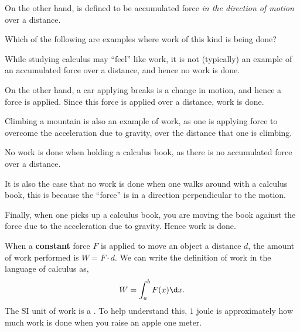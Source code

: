 \documentclass{ximera}
\begin{document}
On the other hand,  is defined to be accumulated force
\textit{in the direction of motion} over a distance.
\begin{question}
  Which of the following are examples where work of this kind is being done?
  \begin{selectAll}
  \end{selectAll}
  \begin{feedback}
    While studying calculus may ``feel'' like work, it is not
    (typically) an example of an accumulated force over a distance,
    and hence no work is done.

    On the other hand, a car applying breaks is a change in motion, and
    hence a force is applied. Since this force is applied over a
    distance, work is done.

    Climbing a mountain is also an example of work, as one is applying
    force to overcome the acceleration due to gravity, over the
    distance that one is climbing.

    No work is done when holding a calculus book, as there is no
    accumulated force over a distance.

    It is also the case that no work is done when one walks around
    with a calculus book, this is because the ``force'' is in a
    direction perpendicular to the motion.

    Finally, when one picks up a calculus book, you are moving the
    book against the force due to the acceleration due to
    gravity. Hence work is done.
  \end{feedback}
\end{question}

When a \textbf{constant} force $F$ is applied to move an object a
distance $d$, the amount of work performed is $W=F\cdot d$.  We can
write the definition of work in the language of calculus as,
\[
W = \int_{a}^{b} F(x) \d x.
\]
The SI unit of work is a . To help understand this, $1$
joule is approximately how much work is done when you raise an apple
one meter.
\end{document}
